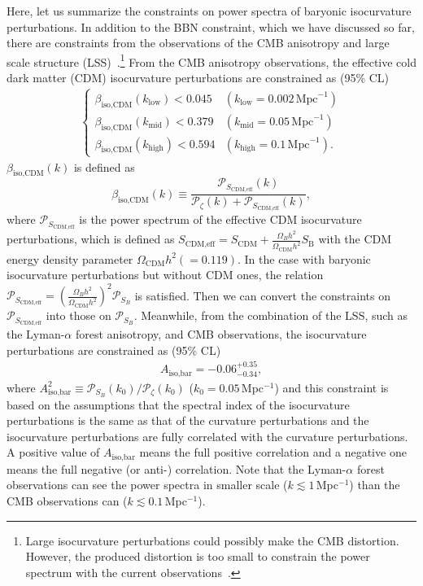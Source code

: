 \documentclass[11pt,a4paper]{article}
\begin{document}
Here, let us summarize the constraints on power spectra of baryonic isocurvature perturbations.
In addition to the BBN constraint, which we have discussed so far, there are constraints from the observations of the CMB anisotropy and large scale structure (LSS)~\cite{Ade:2015lrj,Seljak:2006bg,Beltran:2005gr}.\footnote{
Large isocurvature perturbations could possibly make the CMB distortion.
However, the produced distortion is too small to constrain the power spectrum with the current observations~\cite{Chluba:2013dna}.}
From the CMB anisotropy observations, the effective cold dark matter (CDM) isocurvature perturbations are constrained as (95\% CL)~\cite{Ade:2015lrj}
\begin{align}
      \begin{cases}
    \beta_\text{iso,CDM}(k_\text{low}) < 0.045 & (k_\text{low}=0.002 \, \text{Mpc}^{-1} ) \\
    \beta_\text{iso,CDM}(k_\text{mid}) < 0.379 & (k_\text{mid}=0.05 \, \text{Mpc}^{-1} )\\
    \beta_\text{iso,CDM}(k_\text{high}) < 0.594 & (k_\text{high}=0.1 \, \text{Mpc}^{-1} ).
    \label{eq:cmb_b_iso_cons}
  \end{cases}
\end{align}
$\beta_\text{iso,CDM}(k)$ is defined as
\begin{equation}
	\beta_\text{iso,CDM}(k) \equiv \frac{\mathcal P_{S_\text{CDM,eff}}(k)}{\mathcal P_{\zeta}(k) + \mathcal P_{S_\text{CDM,eff}}(k)},
    \label{eq:cdm_iso_cons}
\end{equation}
where $\mathcal P_{S_\text{CDM,eff}}$ is the power spectrum of the effective CDM isocurvature perturbations, which is defined as $S_\text{CDM,eff} = S_\text{CDM} + \frac{\Omega_B h^2}{\Omega_\text{CDM} h^2} S_\text{B}$ with the CDM energy density parameter $\Omega_\text{CDM}h^2 (=0.119)$. 
In the case with baryonic isocurvature perturbations but without CDM ones, the relation $\mathcal P_{S_\text{CDM,eff}} = \left(\frac{\Omega_B h^2}{\Omega_\text{CDM} h^2}\right)^2 \mathcal P_{S_B}$ is satisfied.
Then we can convert the constraints on $\mathcal P_{S_\text{CDM,eff}}$ into those on $\mathcal P_{S_B}$.
Meanwhile, from the combination of the LSS, such as the Lyman-$\alpha$ forest anisotropy, and CMB observations, the isocurvature perturbations are constrained as (95\% CL)~\cite{Seljak:2006bg}
\begin{align}
	A_\text{iso,bar} = -0.06^{+0.35}_{-0.34},
    \label{eq:lya_b_iso_cons}	
\end{align}
where $A^2_\text{iso,bar} \equiv \mathcal P_{S_B}(k_0) / \mathcal P_{\zeta}(k_0)$ ($k_0 = 0.05$\,Mpc$^{-1}$) 
and this constraint is based on the assumptions that the spectral index of the isocurvature perturbations is the same as that of the curvature perturbations and the isocurvature perturbations are fully correlated with the curvature perturbations.
A positive value of $A_\text{iso,bar}$ means the full positive correlation and a negative one means the full negative (or anti-) correlation.
Note that the Lyman-$\alpha$ forest observations can see the power spectra in smaller scale ($k\lesssim 1$\,Mpc$^{-1}$) than the CMB observations can ($k\lesssim 0.1$\,Mpc$^{-1}$).
\end{document}
